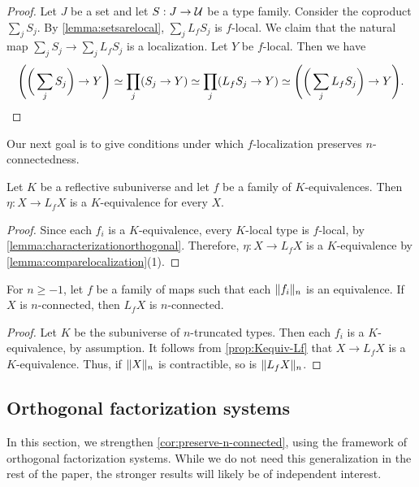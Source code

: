 \begin{proof}
    Let $J$ be a set and let $S : J \to \UU$ be a type family.
    Consider the coproduct $\sum_j S_j$.
    By \cref{lemma:setsarelocal}, $\sum_j L_f S_j$ is $f$-local. We claim that the natural
    map $\sum_j S_j \to \sum_j L_f S_j$ is a localization.
    Let $Y$ be $f$-local. Then we have
    \[
        \Bigg( \bigg( \sum_j S_j \bigg) \to Y \Bigg) \simeq \prod_j (S_j \to Y) \simeq
        \prod_j (L_f S_j \to Y) \simeq \Bigg( \bigg( \sum_j L_f S_j \bigg) \to Y \Bigg).\qedhere
    \]
\end{proof}

\medskip

Our next goal is to give conditions under which $f$-localization
preserves $n$-connected\-ness.

\begin{prp}\label{prop:Kequiv-Lf}
Let $K$ be a reflective subuniverse and let $f$ be a family of $K$-equiva\-lences.
Then $\eta : X \to L_f X$ is a $K$-equivalence for every $X$.
\end{prp}

\begin{proof}
Since each $f_i$ is a $K$-equivalence, every $K$-local type is $f$-local,
by \cref{lemma:characterizationorthogonal}.
Therefore, $\eta : X \to L_f X$ is a $K$-equivalence
by \cref{lemma:comparelocalization}(1).
\end{proof}

\begin{cor}\label{cor:preserve-n-connected}
For $n \geq -1$, let $f$ be a family of maps such that each $\trunc{n}{f_i}$ is an equivalence.
If $X$ is $n$-connected, then $L_f X$ is $n$-connected.
\end{cor}

\begin{proof}
Let $K$ be the subuniverse of $n$-truncated types.
Then each $f_i$ is a $K$-equivalence, by assumption.
It follows from \cref{prop:Kequiv-Lf} that $X \to L_f X$ is a $K$-equivalence.
Thus, if $\trunc{n}{X}$ is contractible, so is $\trunc{n}{L_f X}$.
\end{proof}

\subsection{Orthogonal factorization systems}\label{ss:orthogonal-factorization-systems}

In this section, we strengthen \cref{cor:preserve-n-connected}, using
the framework of orthogonal factorization systems.
While we do not need this generalization in the rest of the paper,
the stronger results will likely be of independent interest.


